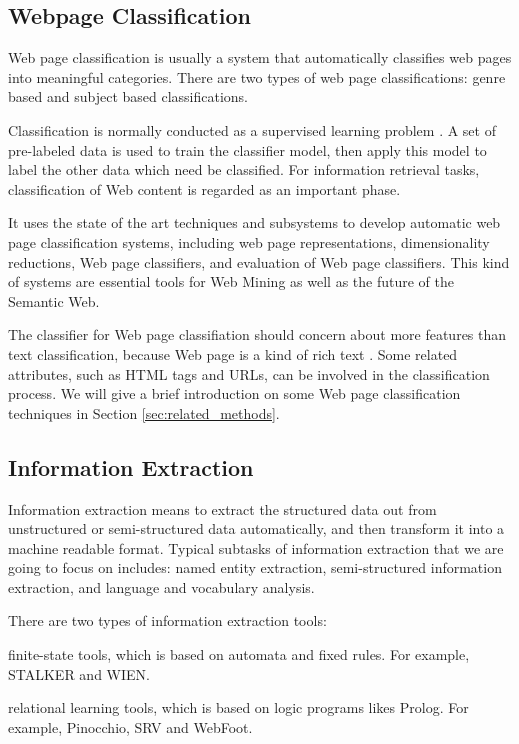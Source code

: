 \subsection{Webpage Classification}
Web page classification is usually a system that automatically classifies web pages into meaningful categories. There are two types of web page classifications: genre based and subject based classifications. 

Classification is normally conducted as a supervised learning problem \cite{joachims1997webwatcher}. A set of pre-labeled data is used to train the classifier model, then apply this model to label the other data which need be classified. For information retrieval tasks, classification of Web content is regarded as an important phase.

It uses the state of the art techniques and subsystems to develop automatic web page classification systems, including web page representations, dimensionality reductions, Web page classifiers, and evaluation of Web page classifiers. This kind of systems are essential tools for Web Mining as well as the future of the Semantic Web\cite{choi2005web}.

The classifier for Web page classifiation should concern about more features than text classification, because Web page is a kind of rich text \cite{Qi:2009:WPC:1459352.1459357,joachims1997webwatcher}. Some related attributes, such as HTML tags and URLs, can be involved in the classification process. We will give a brief introduction on some Web page classification techniques in Section \ref{sec:related_methods}.

\subsection{Information Extraction}
Information extraction means to extract the structured data out from unstructured or semi-structured data automatically, and then transform it into a machine readable format\cite{Cowie:1996:IE:234173.234209}. Typical subtasks of information extraction that we are going to focus on includes: named entity extraction, semi-structured information extraction, and language and vocabulary analysis.

There are two types of information extraction tools\cite{chang2006survey}: 
	\begin{enumerate*}[label=\textit{(\arabic*)}]
		\item finite-state tools, which is based on automata and fixed rules. For example, STALKER and WIEN.
		\item relational learning tools, which is based on logic programs likes Prolog. For example, Pinocchio, SRV and WebFoot\cite{soderland1997learning,ciravegna2000learning}.
	\end{enumerate*}


